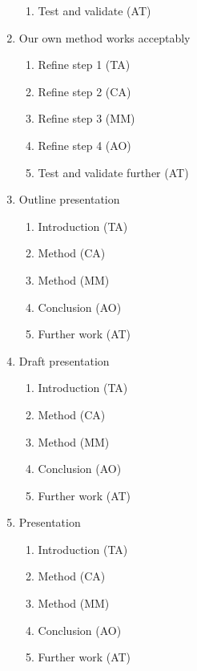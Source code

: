 \documentclass[11pt, a4paper]{article}
\begin{document}
\begin{multicols}{3}
\begin{enumerate}
\begin{enumerate}
                \item Test and validate (AT)
            \end{enumerate}
            \item Our own method works acceptably
            \begin{enumerate}
                \item Refine step 1 (TA)
                \item Refine step 2 (CA)
                \item Refine step 3 (MM)
                \item Refine step 4 (AO)
                \item Test and validate further (AT)
            \end{enumerate}
            \item Outline presentation
            \begin{enumerate}
                \item Introduction (TA)
                \item Method (CA)
                \item Method (MM)
                \item Conclusion (AO)
                \item Further work (AT)
            \end{enumerate}
            \item Draft presentation
            \begin{enumerate}
                \item Introduction (TA)
                \item Method (CA)
                \item Method (MM)
                \item Conclusion (AO)
                \item Further work (AT)
            \end{enumerate}
            \item Presentation
            \begin{enumerate}
                \item Introduction (TA)
                \item Method (CA)
                \item Method (MM)
                \item Conclusion (AO)
                \item Further work (AT)
            \end{enumerate}
        \end{enumerate}
    \end{multicols}
\end{document}
